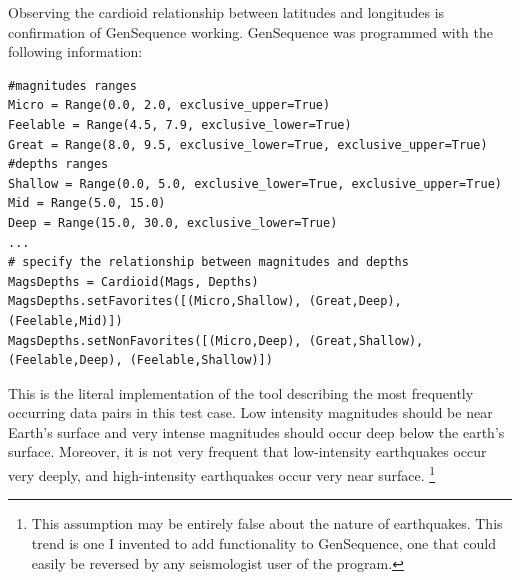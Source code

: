 \noindent{}

\vspace{1cm}
Observing the cardioid relationship between latitudes and longitudes is confirmation of GenSequence working. GenSequence was programmed with the following information:
\vspace{1cm}

\begin{lstlisting}
#magnitudes ranges
Micro = Range(0.0, 2.0, exclusive_upper=True)
Feelable = Range(4.5, 7.9, exclusive_lower=True)
Great = Range(8.0, 9.5, exclusive_lower=True, exclusive_upper=True)
#depths ranges
Shallow = Range(0.0, 5.0, exclusive_lower=True, exclusive_upper=True)
Mid = Range(5.0, 15.0)
Deep = Range(15.0, 30.0, exclusive_lower=True)
...
# specify the relationship between magnitudes and depths
MagsDepths = Cardioid(Mags, Depths)
MagsDepths.setFavorites([(Micro,Shallow), (Great,Deep), (Feelable,Mid)])
MagsDepths.setNonFavorites([(Micro,Deep), (Great,Shallow), (Feelable,Deep), (Feelable,Shallow)])
\end{lstlisting}

\vspace{1cm}
This is the literal implementation of the tool describing the most frequently occurring data pairs in this test case. Low intensity magnitudes should be near Earth’s surface and very intense magnitudes should occur deep below the earth’s surface. Moreover, it is not very frequent that low-intensity earthquakes occur very deeply, and high-intensity earthquakes occur very near surface. \footnote{This assumption may be entirely false about the nature of earthquakes. This trend is one I invented to add functionality to GenSequence, one that could easily be reversed by any seismologist user of the program.}

